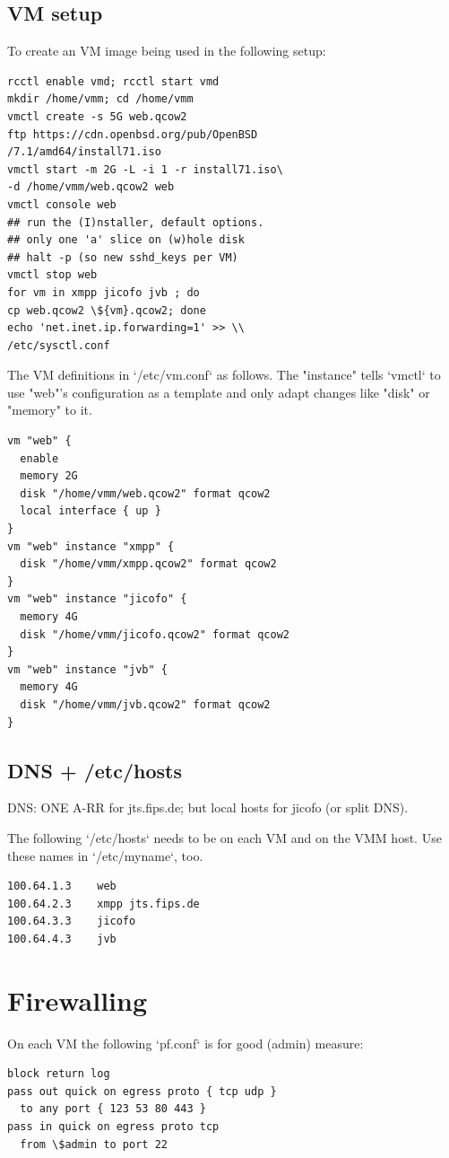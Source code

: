 \documentclass[conference]{IEEEtran}
\begin{document}
\subsection{VM setup}
To create an VM image being used in the following setup:
\begin{verbatim}
rcctl enable vmd; rcctl start vmd
mkdir /home/vmm; cd /home/vmm
vmctl create -s 5G web.qcow2
ftp https://cdn.openbsd.org/pub/OpenBSD
/7.1/amd64/install71.iso
vmctl start -m 2G -L -i 1 -r install71.iso\
-d /home/vmm/web.qcow2 web
vmctl console web
## run the (I)nstaller, default options.
## only one 'a' slice on (w)hole disk
## halt -p (so new sshd_keys per VM)
vmctl stop web
for vm in xmpp jicofo jvb ; do 
cp web.qcow2 \${vm}.qcow2; done
echo 'net.inet.ip.forwarding=1' >> \\
/etc/sysctl.conf
\end{verbatim}
The VM definitions in `/etc/vm.conf` as follows. The "instance" tells `vmctl`
to use "web"'s configuration as a template and only adapt changes like "disk"
or "memory" to it.
\begin{verbatim}
vm "web" {
  enable
  memory 2G
  disk "/home/vmm/web.qcow2" format qcow2
  local interface { up }
}
vm "web" instance "xmpp" {
  disk "/home/vmm/xmpp.qcow2" format qcow2
}
vm "web" instance "jicofo" {
  memory 4G
  disk "/home/vmm/jicofo.qcow2" format qcow2
}
vm "web" instance "jvb" {
  memory 4G
  disk "/home/vmm/jvb.qcow2" format qcow2
}
\end{verbatim}
\subsection{DNS + /etc/hosts}
DNS: ONE A-RR for jts.fips.de; but local hosts for jicofo (or split DNS).

The following `/etc/hosts` needs to be on each VM and on the VMM host.
Use these names in `/etc/myname`, too.
\begin{verbatim}
100.64.1.3    web
100.64.2.3    xmpp jts.fips.de
100.64.3.3    jicofo
100.64.4.3    jvb
\end{verbatim}
\section{Firewalling}
On each VM the following `pf.conf` is for good (admin) measure:
\begin{verbatim}
block return log
pass out quick on egress proto { tcp udp }
  to any port { 123 53 80 443 }
pass in quick on egress proto tcp 
  from \$admin to port 22
\end{verbatim}
\end{document}
